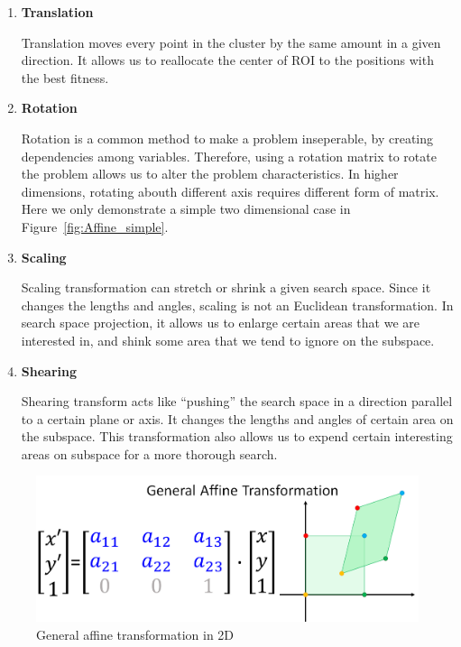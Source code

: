 \begin{enumerate}
    \item \textbf{Translation}

            Translation moves every point in the cluster by the same amount in a given direction.
            It allows us to reallocate the center of ROI to the positions with the best fitness.

    \item \textbf{Rotation}

            Rotation is a common method to make a problem inseperable, by creating dependencies among variables.
            Therefore, using a rotation matrix to rotate the problem allows us to alter the problem characteristics.
            In higher dimensions, rotating abouth different axis requires different form of matrix.
            Here we only demonstrate a simple two dimensional case in Figure~\ref{fig:Affine_simple}.

    \item \textbf{Scaling}

            Scaling transformation can stretch or shrink a given search space.
            Since it changes the lengths and angles, scaling is not an Euclidean transformation.
            In search space projection, it allows us to enlarge certain areas that we are interested in,
            and shink some area that we tend to ignore on the subspace.

    \item \textbf{Shearing}

            Shearing transform acts like ``pushing'' the search space in a direction parallel to a certain plane or axis.
            It changes the lengths and angles of certain area on the subspace.
            This transformation also allows us to expend certain interesting areas on subspace for a more thorough search.

\end{enumerate} 


\begin{figure}[H]
\centering
\includegraphics[width=\textwidth]{Affine}
\caption{General affine transformation in 2D}\label{fig:Affine}
\end{figure}

